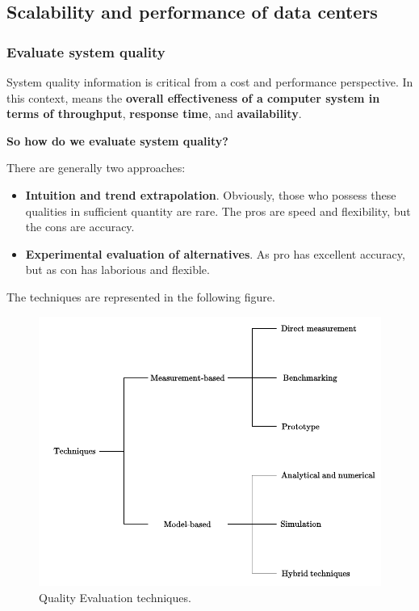 \subsection{Scalability and performance of data centers}

\subsubsection{Evaluate system quality}

System quality information is critical from a cost and performance perspective. In this context,  means the \textbf{overall effectiveness of a computer system in terms of throughput}, \textbf{response time}, and \textbf{availability}.

\begin{flushleft}
	\textcolor{Green3}{ \textbf{So how do we evaluate system quality?}}
\end{flushleft}
There are generally two approaches:
\begin{itemize}
	\item \textbf{Intuition and trend extrapolation}. Obviously, those who possess these qualities in sufficient quantity are rare. The pros are speed and flexibility, but the cons are accuracy.
	
	\item \textbf{Experimental evaluation of alternatives}. As pro has excellent accuracy, but as con has laborious and flexible.
\end{itemize}
The techniques are represented in the following figure.

\begin{figure}[!htp]
	\centering
	\includegraphics[width=\textwidth]{img/quality-evaluation.pdf}
	\caption{Quality Evaluation techniques.}
	\label{fig: Quality Evaluation techniques}
\end{figure}

